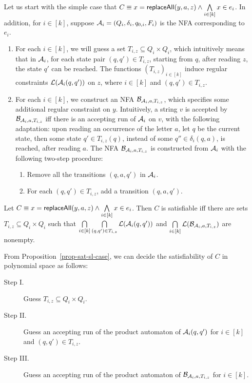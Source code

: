 Let us start with the simple case that $C \equiv x = \mathsf{replaceAll}(y, a, z) \wedge \bigwedge \limits_{i \in [k]} x \in e_{i}$.  In addition, for $i \in [k]$, suppose $\mathcal{A}_i = (Q_i, \delta_i, q_{0, i}, F_i)$ 
is the NFA corresponding to $e_i$. 
\begin{enumerate}
\item For each $i \in [k]$, we will guess a set $T_{i, z} \subseteq Q_i \times Q_i$, which intuitively means that in $\mathcal{A}_i$, for each state pair $(q, q') \in T_{i, z}$, starting from $q$, after reading $z$, the state $q' $ can be reached. The functions  $(T_{i, z})_{i \in [k]}$ induce regular constraints $\mathcal{L}(\mathcal{A}_i(q,q'))$ on $z$, where $i \in [k]$ and $(q,q') \in T_{i, z}$.

\item For each $i \in [k]$, we construct an NFA $\mathcal{B}_{\mathcal{A}_i, a,  T_{i, z}}$, which specifies some additional regular constraint on $y$. Intuitively, a string $v$ is accepted by $\mathcal{B}_{\mathcal{A}_i, a,  T_{i, z}}$ iff there is an accepting run of $\mathcal{A}_i$ on $v$, with the following adaptation: upon reading an occurrence of the letter $a$, let $q$ be the current state, then some state $q' \in T_{i, z}(q)$, instead of some $q'' \in \delta_i(q,a)$, is reached, after reading $a$. The NFA $\mathcal{B}_{\mathcal{A}_i, a,  T_{i, z}}$ is constructed from $\mathcal{A}_i$ with the following two-step procedure: 
\begin{enumerate}
\item Remove all the transitions $(q, a, q')$ in $\mathcal{A}_i$.
%
\item For each $(q, q') \in T_{i, z}$, add a transition $(q, a, q')$.
\end{enumerate}
\end{enumerate}

\begin{proposition}\label{prop-sat-sl-case}
Let $C \equiv x = \mathsf{replaceAll}(y, a, z) \wedge \bigwedge \limits_{i \in [k]} x \in e_{i}$. Then $C$ is satisfiable iff there are sets $T_{i, z} \subseteq Q_i \times Q_i$ such that $\bigcap \limits_{i \in [k]} \bigcap \limits_{(q,q') \in T_{i, z}} \mathcal{L}(\mathcal{A}_{i}(q, q'))$ and $\bigcap \limits_{i \in [k]} \mathcal{L}(\mathcal{B}_{\mathcal{A}_i, a,  T_{i, z}})$ are nonempty.
\end{proposition}

From Proposition~\ref{prop-sat-sl-case}, we can decide the satisfiability of $C$ in polynomial space as follows: 
\begin{description}
\item[Step I.] Guess $T_{i,z} \subseteq Q_i \times Q_i$. 
%
\item[Step II.] Guess an accepting run of the product automaton of $\mathcal{A}_{i}(q, q')$ for $i \in [k]$ and $(q,q') \in T_{i, z}$. 
%
\item[Step III.] Guess an accepting run of the product automaton of $\mathcal{B}_{\mathcal{A}_i, a,  T_{i, z}}$ for $i \in [k]$.
\end{description}

